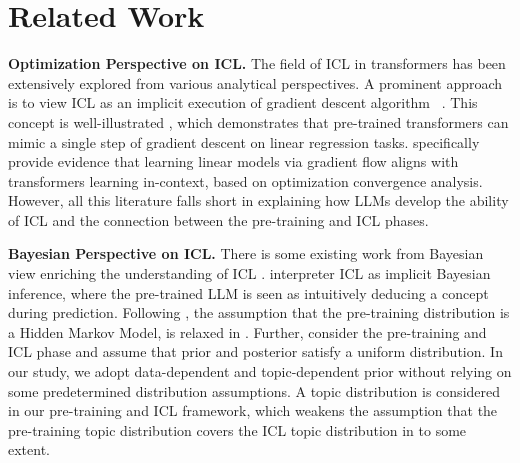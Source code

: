 \section{Related Work}
\textbf{Optimization Perspective on ICL.} \quad The field of ICL in transformers has been extensively explored from various analytical perspectives. 
A prominent approach is to view ICL as an implicit execution of gradient descent algorithm ~\citep{akyurek2022learning,oswald2023transformers,dai2023can,zhang2023trained}. This concept is well-illustrated \citep{akyurek2022learning,oswald2023transformers}, which demonstrates that pre-trained transformers can mimic a single step of gradient descent on linear regression tasks. 
\citet{huang2023context, zhang2023trained} specifically provide evidence that learning linear models via gradient flow aligns with transformers learning in-context, based on optimization convergence analysis. However, all this literature falls short in explaining how LLMs develop the ability of ICL and the connection between the pre-training and ICL phases. 

\textbf{Bayesian Perspective on ICL.} \quad There is some existing work from Bayesian view enriching the understanding of ICL \citep{han2023context,jiang2023latent,wang2023large,wies2023learnability,xie2021explanation}. \citet{xie2021explanation} interpreter ICL as implicit Bayesian inference, where the pre-trained LLM is seen as intuitively deducing a concept during prediction. 
Following \cite{xie2021explanation}, the assumption that the pre-training distribution is a Hidden Markov Model, is relaxed in \cite{wies2023learnability}.  
Further, \citet{zhang2023trained} consider the pre-training and ICL phase and assume that prior and posterior satisfy a uniform distribution. In our study, we adopt data-dependent and topic-dependent prior without relying on some predetermined distribution assumptions. A topic distribution is considered in our pre-training and ICL framework, which weakens the assumption that the pre-training topic distribution covers the ICL topic distribution in \cite{zhang2023trained} to some extent.

